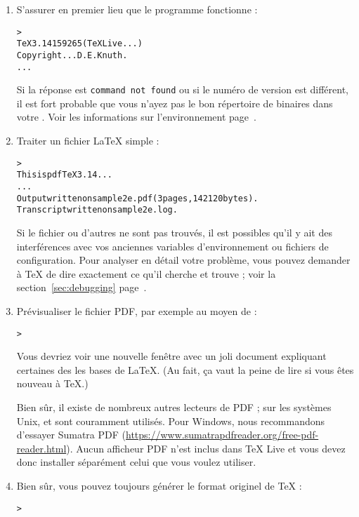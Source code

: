 \documentclass[german, english, french]{article}
\renewcommand{\TL}{\TeX{} Live\xspace}%
\begin{document}
\begin{enumerate}

\item S'assurer en premier lieu que le programme  fonctionne :

\begin{alltt}
> 
TeX 3.14159265 (TeX Live ...)
Copyright ... D.E. Knuth.
...
\end{alltt}

Si la réponse est \texttt{command not found} ou si le numéro de version est
différent, il est fort probable que vous n'ayez pas le bon répertoire de
binaires dans votre .  Voir les informations sur l'environnement
page~\pageref{sec:env}.

\item Traiter un fichier \LaTeX{} simple :

\begin{alltt}
> 
This is pdfTeX 3.14...
...
Output written on sample2e.pdf (3 pages, 142120 bytes).
Transcript written on sample2e.log.
\end{alltt}
Si le fichier  ou d'autres ne sont pas trouvés, il est
possibles qu'il y ait des interférences avec vos anciennes variables
d'environnement ou fichiers de configuration. Pour analyser en détail votre
problème, vous pouvez demander à \TeX{} de dire exactement ce qu'il cherche et
trouve ; voir la section~\ref{sec:debugging} page~\pageref{sec:debugging}.

\item Prévisualiser le fichier PDF, par exemple au moyen de :
\begin{alltt}
> 
\end{alltt}
Vous devriez voir une nouvelle fenêtre avec un joli document expliquant
certaines des les bases de \LaTeX{}.  (Au fait, ça vaut la peine de lire si
vous êtes nouveau à \TeX.)

Bien sûr, il existe de nombreux autres lecteurs de PDF ; sur les systèmes Unix,
 et  sont couramment utilisés. Pour Windows,
nous recommandons d'essayer Sumatra PDF
(\url{https://www.sumatrapdfreader.org/free-pdf-reader.html}). Aucun afficheur
PDF n'est inclus dans \TL{} et vous devez donc installer séparément celui que
vous voulez utiliser.

\item Bien sûr, vous pouvez toujours générer le format originel \dvi{} de
  \TeX{} :
\begin{alltt}
> 
\end{alltt}


\end{enumerate}
\end{document}
